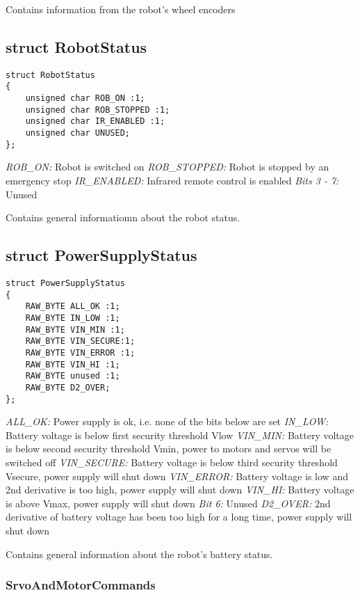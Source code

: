 \documentclass{book}
\begin{document}
Contains information from the robot's wheel encoders

\subsection{struct RobotStatus}


\begin{lstlisting}
struct RobotStatus
{
	unsigned char ROB_ON :1;
	unsigned char ROB_STOPPED :1;
	unsigned char IR_ENABLED :1;
	unsigned char UNUSED;
};
\end{lstlisting}


\textit{ROB\_ON:}	Robot is switched on
\textit{ROB\_STOPPED:}	Robot is stopped by an emergency stop
\textit{IR\_ENABLED:}	Infrared remote control is enabled
\textit{Bits 3 - 7:}	Unused 

Contains general informatiomn about the robot status.

\subsection{struct PowerSupplyStatus}

\begin{lstlisting}
struct PowerSupplyStatus
{
	RAW_BYTE ALL_OK :1;
	RAW_BYTE IN_LOW :1;
	RAW_BYTE VIN_MIN :1;
	RAW_BYTE VIN_SECURE:1;
	RAW_BYTE VIN_ERROR :1;
	RAW_BYTE VIN_HI :1;
	RAW_BYTE unused :1;
	RAW_BYTE D2_OVER;
};
\end{lstlisting}

\textit{ALL\_OK:}	Power supply is ok, i.e. none of the bits below are set
\textit{IN\_LOW:}	Battery voltage is below first security threshold Vlow
\textit{VIN\_MIN:}	Battery voltage is below second security threshold Vmin, power to motors and servos will be switched off
\textit{VIN\_SECURE:}	Battery voltage is below third security threshold Vsecure, power supply will shut down
\textit{VIN\_ERROR:}	Battery voltage is low and 2nd derivative is too high, power supply will shut down
\textit{VIN\_HI:}	Battery voltage is above Vmax, power supply will shut down
\textit{Bit 6:}	Unused	
\textit{D2\_OVER:}	2nd derivative of battery voltage has been too high for a long time, power supply will shut down

Contains general information about the robot's battery status.



\subsubsection{SrvoAndMotorCommands}
\end{document}
